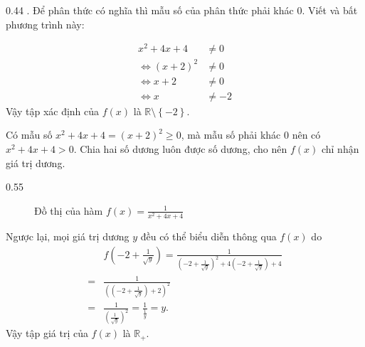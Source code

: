 {
   \begin{minipageindent}{0.44\textwidth}
. Để phân thức có nghĩa thì mẫu số của phân thức phải khác $0$. Viết và bất phương trình này:

      \begin{align*}
         x^2 + 4x + 4 &\neq 0\\
         \iff \left(x + 2\right)^2 &\neq 0\\
         \iff x + 2 &\neq 0 \\
         \iff x &\neq -2
      \end{align*}
      Vậy tập xác định của $f(x)$ là $\mathbb{R} \setminus \left\{-2\right\}$.

      Có mẫu số $x^2 + 4x + 4 = (x + 2)^2 \geq 0$, mà mẫu số phải khác $0$ nên có $x^2 + 4x + 4 > 0$. Chia hai số dương luôn được số dương, cho nên $f(x)$ chỉ nhận giá trị dương.
   \end{minipageindent}
   \hfill
   \begin{minipageindent}{0.55\textwidth}
      \begin{figure}[H]
         \centering
         \caption{Đồ thị của hàm $f(x) = \frac{1}{x^2 + 4x + 4}$}
         \label{fig:ham_so_mot_bien:phan_thuc:1_x2_4x_4}
      \end{figure}
   \end{minipageindent}
}

Ngược lại, mọi giá trị dương $y$ đều có thể biểu diễn thông qua $f(x)$ do \begin{align*}
   &f\left(-2 + \frac{1}{\sqrt{y}}\right) = \frac{1}{\left(-2 + \frac{1}{\sqrt{y}}\right)^2 + 4\left(-2 + \frac{1}{\sqrt{y}}\right) + 4}\\
   =& \frac{1}{\left(\left(-2 + \frac{1}{\sqrt{y}}\right) + 2\right)^2} \\
   =&\frac{1}{\left(\frac{1}{\sqrt{y}}\right)^2} =\frac{1}{\frac{1}{y}} =y.
\end{align*}
Vậy tập giá trị của $f(x)$ là $\mathbb{R}_+$.

